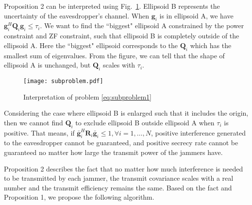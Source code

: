 \documentclass[12pt, journal,onecolumn,draftclsnofoot]{IEEEtran}
\begin{document}
Proposition 2 can be interpreted using Fig.~\ref{fig:interpretation of subproblems}. Ellipsoid B represents the uncertainty of the eavesdropper's channel. When $\mathbf{g}_i$ is in ellipsoid A, we have $\mathbf{g}_i^H\mathbf{Q}_i\mathbf{g}_i \leq  \tau_{i}$. We want to find the ``biggest" ellipsoid A constrained by the power constraint and ZF constraint, such that ellipsoid B is completely outside of the ellipsoid A. Here the ``biggest" ellipsoid corresponds to the $\mathbf{Q}_i$ which has the smallest sum of eigenvalues.  From the figure, we can tell that the shape of ellipsoid A is unchanged, but $\mathbf{Q}_i$ scales with $\tau_i$.
\begin{figure}[ht]
	\centering
	\texttt{[image: subproblem.pdf]} %
	\caption{Interpretation of problem \eqref{eq:subproblem1}}
	\label{fig:interpretation of subproblems}
\end{figure}
Considering the case where  ellipsoid B is enlarged such that it includes the origin, then we cannot find $\mathbf{Q}_i$ to exclude ellipsoid B outside ellipsoid A when $\tau_i$ is positive. That means, if  $\bar{\mathbf{g}}_i^H\mathbf{R}_i\bar{\mathbf{g}}_i \leq 1, \forall i = 1, \ldots,N$, positive interference generated to the eavesdropper cannot be guaranteed, and positive secrecy rate cannot be guaranteed no matter how large the transmit power of the jammers have.   


Proposition 2 describes the fact that no matter how much interference is needed to be transmitted by each jammer, the transmit covariance scales with a real number and the transmit efficiency remains the same.  Based on the fact and Proposition 1, we propose the following algorithm.
\end{document}
